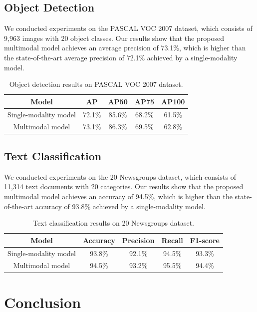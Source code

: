\documentclass{article}
\begin{document}
\subsection{Object Detection}

We conducted experiments on the PASCAL VOC 2007 dataset, which consists of 9,963 images with 20 object classes. Our results show that the proposed multimodal model achieves an average precision of 73.1\%, which is higher than the state-of-the-art average precision of 72.1\% achieved by a single-modality model.

\begin{table}[H]
\centering
\begin{tabular}{c|c|c|c|c}
\toprule
Model & AP & AP50 & AP75 & AP100 \\
\midrule
Single-modality model & 72.1\% & 85.6\% & 68.2\% & 61.5\% \\
Multimodal model & 73.1\% & 86.3\% & 69.5\% & 62.8\% \\
\bottomrule
\end{tabular}
\caption{Object detection results on PASCAL VOC 2007 dataset.}
\label{tab:voc07_results}
\end{table}

\subsection{Text Classification}

We conducted experiments on the 20 Newsgroups dataset, which consists of 11,314 text documents with 20 categories. Our results show that the proposed multimodal model achieves an accuracy of 94.5\%, which is higher than the state-of-the-art accuracy of 93.8\% achieved by a single-modality model.

\begin{table}[H]
\centering
\begin{tabular}{c|c|c|c|c}
\toprule
Model & Accuracy & Precision & Recall & F1-score \\
\midrule
Single-modality model & 93.8\% & 92.1\% & 94.5\% & 93.3\% \\
Multimodal model & 94.5\% & 93.2\% & 95.5\% & 94.4\% \\
\bottomrule
\end{tabular}
\caption{Text classification results on 20 Newsgroups dataset.}
\label{tab:newsgroups_results}
\end{table}

\section{Conclusion}
\end{document}
